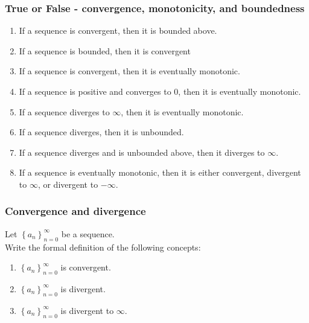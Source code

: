 \documentclass[14pt]{beamer}
\newcommand{\N}{\mathbb{N}}
\newcommand{\setsize}[1]{\fontsize{#1}{#1}\selectfont} %
\newcommand{\smallerfont}{\setsize{13}} %
\newcommand{\an}{\left\{ a_n \right\}_{n=0}^{\infty}}
\newcommand{\Rn}{\left\{ R_n \right\}_{n=0}^{\infty}}
\begin{document}
%
	\begin{frame}[t]
		\smallerfont
		\frametitle{\smallerfont True or False - convergence, monotonicity, and
		boundedness}

		\begin{enumerate}
			\item If a sequence is convergent, then it is bounded above.

			\item If a sequence is bounded, then it is convergent

			\item If a sequence is convergent, then it is eventually monotonic.

			\item If a sequence is positive and converges to 0, then it is eventually
				monotonic.

			\item If a sequence diverges to $\infty$, then it is eventually monotonic.

			\item If a sequence diverges, then it is unbounded.

			\item If a sequence diverges and is unbounded above, then it diverges to
				$\infty$.

			\item If a sequence is eventually monotonic, then it is either convergent,
				divergent to $\infty$, or divergent to $-\infty$.
		\end{enumerate}
	\end{frame}
	\begin{frame}[t]
		\frametitle{Convergence and divergence}

		Let ${\displaystyle \an}$ be a sequence. \\ Write the formal definition of the
		following concepts:

		\begin{enumerate}
			\item ${\displaystyle \an}$ is convergent.

				\vfill

			\item ${\displaystyle \an}$ is divergent.

				\vfill

			\item ${\displaystyle \an}$ is divergent to $\infty$.

				\vfill
		\end{enumerate}
	\end{frame}
\end{document}
